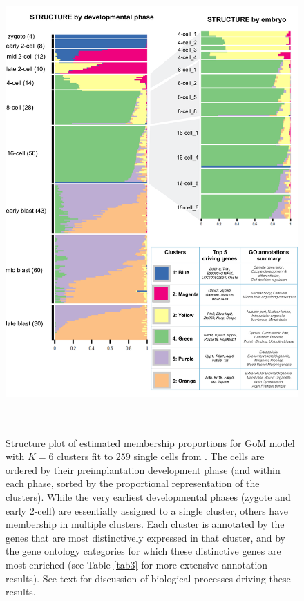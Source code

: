 \documentclass[10pt,letterpaper]{article}
\begin{document}
\begin{figure}[h!]
\centering
\includegraphics[height=7in, width=5.5in]{../plots/deng-figures/deng-main-v4.pdf}
\caption{Structure plot of estimated membership proportions for GoM model with $K=6$ clusters fit to $259$ single cells from  \cite{Deng2014}. The cells are ordered
by their preimplantation development phase (and within each phase, sorted by the proportional representation of the clusters). While the very earliest developmental phases
(zygote and early 2-cell) are essentially assigned to a single cluster, others have membership in multiple clusters. Each cluster is annotated by
the genes that are most distinctively expressed in that cluster, and by the gene ontology categories for which these distinctive genes are most enriched (see Table \ref{tab3} for more extensive annotation results). See text for discussion of biological processes driving these results.}
\label{fig4}
\end{figure}
\end{document}
